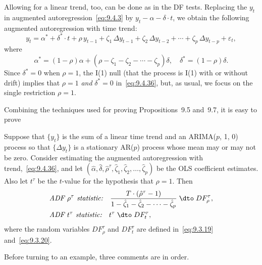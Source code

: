 Allowing for a linear trend, too, can be done as in the DF tests. Replacing the
$y_t$ in augmented autoregression~\eqref{eq:9.4.3} by $y_t - \alpha - \delta \cdot t$, we obtain the following
augmented autoregression with time trend:
\begin{equation}
\label{eq:9.4.36}
y_t = \alpha^* + \delta^* \cdot t + \rho\, y_{t-1} + \zeta_1\,\Delta y_{t-1}
+ \zeta_2\,\Delta y_{t-2} + \cdots + \zeta_p\,\Delta y_{t-p} + \varepsilon_t,
\end{equation}
where
\begin{equation}
\label{eq:9.4.37}
\alpha^* = (1-\rho)\alpha + (\rho - \zeta_1 - \zeta_2 - \cdots - \zeta_p)\delta,
\quad \delta^* = (1-\rho)\delta.
\end{equation}
Since $\delta^* = 0$ when $\rho = 1$, the I(1) null (that the process is I(1) with or without
drift) implies that $\rho = 1$ \emph{and} $\delta^* = 0$ in~\eqref{eq:9.4.36}, but, as usual, we focus on the
single restriction $\rho = 1$.

Combining the techniques used for proving Propositions~9.5 and~9.7, it is easy
to prove

\begin{proposition}
\label{prop:9.8}
Suppose that $\{y_t\}$ is the sum of a linear time trend and an ARIMA($p$, 1, 0)
process so that $\{\Delta y_t\}$ is a stationary AR($p$) process whose mean may or may not
be zero. Consider estimating the augmented autoregression with trend,~\eqref{eq:9.4.36},
and let $(\hat{\alpha}, \hat{\delta}, \hat{\rho}^\tau, \hat{\zeta}_1, \hat{\zeta}_2, \ldots, \hat{\zeta}_p)$ be the OLS coefficient estimates. Also let $t^\tau$ be
the $t$-value for the hypothesis that $\rho = 1$. Then
\begin{align}
&\textit{ADF $\rho^\tau$ statistic:}\quad
\frac{T \cdot (\hat{\rho}^\tau - 1)}{1 - \hat{\zeta}_1 - \hat{\zeta}_2 - \cdots - \hat{\zeta}_p}
\;\dto\; DF_\rho^\tau,
\label{eq:9.4.38} \\
&\textit{ADF $t^\tau$ statistic:}\quad t^\tau \;\dto\; DF_t^\tau,
\label{eq:9.4.39}
\end{align}
where the random variables $DF_\rho^\tau$ and $DF_t^\tau$ are defined in~\eqref{eq:9.3.19} and~\eqref{eq:9.3.20}.
\end{proposition}

Before turning to an example, three comments are in order.


